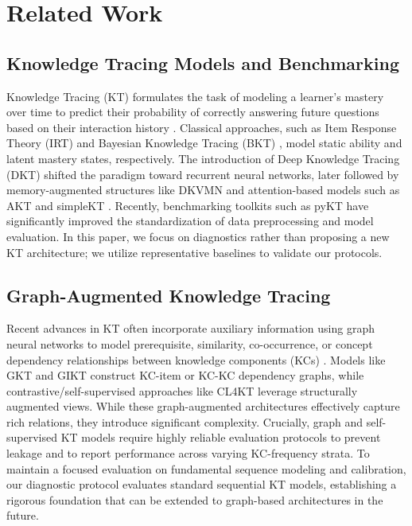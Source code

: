 \section{Related Work}
\label{sec:related}

\subsection{Knowledge Tracing Models and Benchmarking}
Knowledge Tracing (KT) formulates the task of modeling a learner's mastery over time to predict their probability of correctly answering future questions based on their interaction history \cite{abdelrahman2023knowledge}. Classical approaches, such as Item Response Theory (IRT) \cite{rasch1960probabilistic,embretson2000item} and Bayesian Knowledge Tracing (BKT) \cite{corbett1994knowledge}, model static ability and latent mastery states, respectively. The introduction of Deep Knowledge Tracing (DKT) \cite{piech2015deep} shifted the paradigm toward recurrent neural networks, later followed by memory-augmented structures like DKVMN \cite{zhang2017dynamic} and attention-based models such as AKT \cite{ghosh2020context} and simpleKT \cite{liu2023simplekt}. Recently, benchmarking toolkits such as pyKT \cite{liu2022pykt} have significantly improved the standardization of data preprocessing and model evaluation. In this paper, we focus on diagnostics rather than proposing a new KT architecture; we utilize representative baselines to validate our protocols.

\subsection{Graph-Augmented Knowledge Tracing}
Recent advances in KT often incorporate auxiliary information using graph neural networks to model prerequisite, similarity, co-occurrence, or concept dependency relationships between knowledge components (KCs) \cite{abdelrahman2023knowledge}. Models like GKT \cite{nakagawa2019graph} and GIKT \cite{yang2021gikt} construct KC-item or KC-KC dependency graphs, while contrastive/self-supervised approaches like CL4KT \cite{lee2022cl4kt} leverage structurally augmented views. While these graph-augmented architectures effectively capture rich relations, they introduce significant complexity. Crucially, graph and self-supervised KT models require highly reliable evaluation protocols to prevent leakage and to report performance across varying KC-frequency strata. To maintain a focused evaluation on fundamental sequence modeling and calibration, our diagnostic protocol evaluates standard sequential KT models, establishing a rigorous foundation that can be extended to graph-based architectures in the future.

